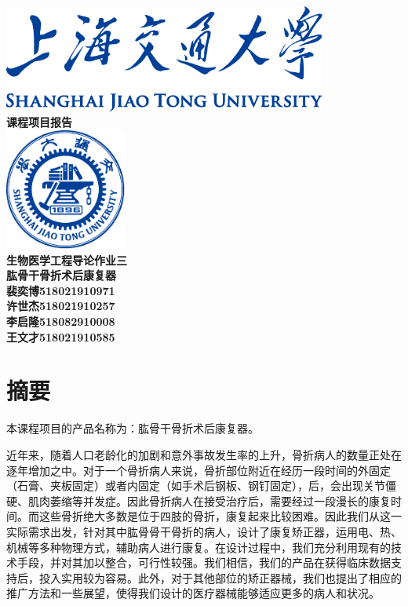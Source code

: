 \documentclass[UTF8]{ctexart}
\begin{document}
\begin{titlepage}
    \begin{center}
        \includegraphics[width=0.8\textwidth]{sjtu-name-blue.pdf}\\[1cm]
        \textsc{\huge \bfseries 课程项目报告}\\[1.5cm]
        \includegraphics[width=0.3\textwidth]{sjtu-badge-blue.pdf}\\[1cm]    
        \textsc{\huge \bfseries 生物医学工程导论作业三}\\[1.5cm]


        \Huge \bfseries{肱骨干骨折术后康复器}\\[1cm]
            
        \Large \bfseries{裴奕博518021910971\\许世杰518021910257\\李启隆518082910008\\王文才518021910585\\}

    \end{center}
\end{titlepage}


\section{摘要}
    本课程项目的产品名称为：肱骨干骨折术后康复器。

    近年来，随着人口老龄化的加剧和意外事故发生率的上升，骨折病人的数量正处在逐年增加之中。对于一个骨折病人来说，骨折部位附近在经历一段时间的外固定（石膏、夹板固定）或者内固定（如手术后钢板、钢钉固定），后，会出现关节僵硬、肌肉萎缩等并发症。因此骨折病人在接受治疗后，需要经过一段漫长的康复时间。而这些骨折绝大多数是位于四肢的骨折，康复起来比较困难。因此我们从这一实际需求出发，针对其中肱骨骨干骨折的病人，设计了康复矫正器，运用电、热、机械等多种物理方式，辅助病人进行康复。在设计过程中，我们充分利用现有的技术手段，并对其加以整合，可行性较强。我们相信，我们的产品在获得临床数据支持后，投入实用较为容易。此外，对于其他部位的矫正器械，我们也提出了相应的推广方法和一些展望，使得我们设计的医疗器械能够适应更多的病人和状况。
\newpage
\end{document}
